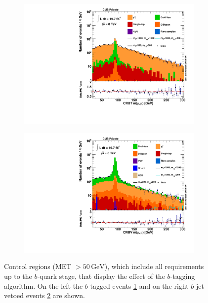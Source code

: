 \begin{figure}[htb!]
  \centering
  \begin{subfigure}[b]{0.495\textwidth}
    \centering
    \includegraphics[width=\textwidth]{plots/crbt.pdf}
    \caption{\label{fig:crbt}}
  \end{subfigure}
  \begin{subfigure}[b]{0.495\textwidth}
    \centering
    \includegraphics[width=\textwidth]{plots/crbv.pdf}
    \caption{\label{fig:crbv}}
  \end{subfigure}
  \caption{Control regions (MET $> 50\,\text{GeV}$), which include all requirements up to the $b$-quark stage, that display the effect of the $b$-tagging algorithm. On the left the $b$-tagged events \ref{fig:crbt} and on the right $b$-jet vetoed events \ref{fig:crbv} are shown.}
  \label{fig:crbtagging}
\end{figure}


